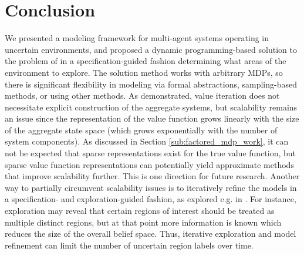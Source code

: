 \documentclass[conference]{IEEEtran}
\renewcommand{\cite}[1]{\citep{#1}}
\begin{document}


\section{Conclusion}
\label{sec:conclusion}

We presented a modeling framework for multi-agent systems operating in uncertain environments, and proposed a dynamic programming-based solution to the problem of in a specification-guided fashion determining what areas of the environment to explore. The solution method works with arbitrary MDPs, so there is significant flexibility in modeling via formal abstractions, sampling-based methods, or using other methods. As demonstrated, value iteration does not necessitate explicit construction of the aggregate systems, but scalability remains an issue since the representation of the value function grows linearly with the size of the aggregate state space (which grows exponentially with the number of system components). As discussed in Section \ref{sub:factored_mdp_work}, it can not be expected that sparse representations exist for the true value function, but sparse value function representations can potentially yield approximate methods that improve scalability further. This is one direction for future research. Another way to partially circumvent scalability issues is to iteratively refine the models in a specification- and exploration-guided fashion, as explored e.g. in \cite{Nilsson2017}. For instance, exploration may reveal that certain regions of interest should be treated as multiple distinct regions, but at that point more information is known which reduces the size of the overall belief space. Thus, iterative exploration and model refinement can limit the number of uncertain region labels over time.  





\end{document}

